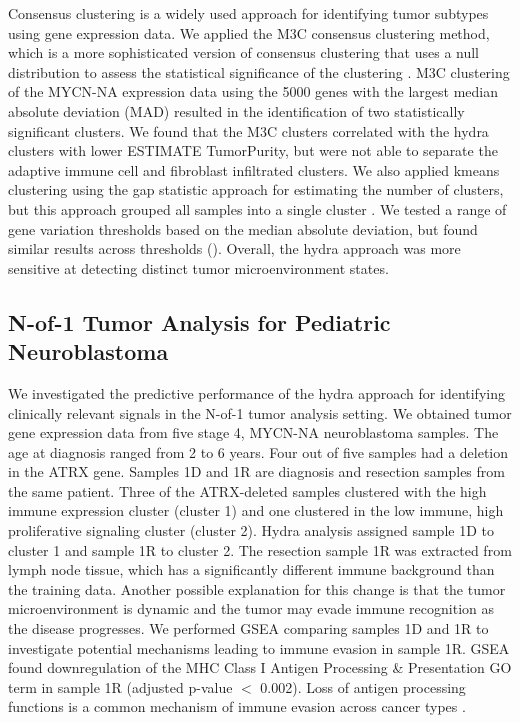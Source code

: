 \documentclass[10pt,letterpaper]{article}
\begin{document}
Consensus clustering is a widely used approach for identifying tumor subtypes using gene expression data. We applied the M3C consensus clustering method, which is a more sophisticated version of consensus clustering that uses a null distribution to assess the statistical significance of the clustering \cite{johnM3CMonteCarlo2018, wilkersonConsensusClusterPlusClassDiscovery2010}. M3C clustering of the MYCN-NA expression data using the 5000 genes with the largest median absolute deviation (MAD) resulted in the identification of two statistically significant clusters. We found that the M3C clusters correlated with the hydra clusters with lower ESTIMATE TumorPurity, but were not able to separate the adaptive immune cell and fibroblast infiltrated clusters. We also applied kmeans clustering using the gap statistic approach for estimating the number of clusters, but this approach grouped all samples into a single cluster \cite{tibshirani2001estimating,maechler2012cluster}. We tested a range of gene variation thresholds based on the median absolute deviation, but found similar results across thresholds (). Overall, the hydra approach was more sensitive at detecting distinct tumor microenvironment states.

\subsection{N-of-1 Tumor Analysis for Pediatric Neuroblastoma}
We investigated the predictive performance of the hydra approach for identifying clinically relevant signals in the N-of-1 tumor analysis setting. We obtained tumor gene expression data from five stage 4, MYCN-NA neuroblastoma samples. The age at diagnosis ranged from 2 to 6 years. Four out of five samples had a deletion in the ATRX gene. Samples 1D and 1R are diagnosis and resection samples from the same patient. Three of the ATRX-deleted samples clustered with the high immune expression cluster (cluster 1) and one clustered in the low immune, high proliferative signaling cluster (cluster 2). Hydra analysis assigned sample 1D to cluster 1 and sample 1R to cluster 2. The resection sample 1R was extracted from lymph node tissue, which has a significantly different immune background than the training data. Another possible explanation for this change is that the tumor microenvironment is dynamic and the tumor may evade immune recognition as the disease progresses. We performed GSEA comparing samples 1D and 1R to investigate potential mechanisms leading to immune evasion in sample 1R. GSEA found downregulation of the MHC Class I Antigen Processing \& Presentation GO term in sample 1R (adjusted p-value $<$ 0.002). Loss of antigen processing functions is a common mechanism of immune evasion across cancer types \cite{reevesAntigenProcessingImmune2017}.
\end{document}

